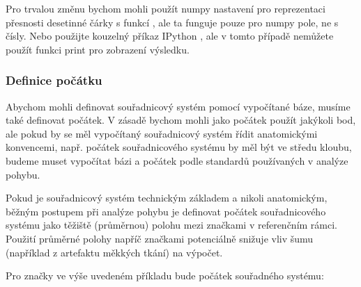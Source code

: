 \documentclass[letterpaper,10pt,english]{jupyterBook}
\begin{document}
\sphinxAtStartPar
Pro trvalou změnu bychom mohli použít numpy nastavení pro reprezentaci přesnosti desetinné čárky s funkcí , ale ta funguje pouze pro numpy pole, ne s čísly. Nebo použijte kouzelný příkaz IPython , ale v tomto případě nemůžete použít funkci print pro zobrazení výsledku.


\subsubsection{Definice počátku}
\label{\detokenize{Prednasky/0_3_Sou_u0159adnicov_xe9_syst_xe9my:definice-pocatku}}
\sphinxAtStartPar
Abychom mohli definovat souřadnicový systém pomocí vypočítané báze, musíme také definovat počátek. V zásadě bychom mohli jako počátek použít jakýkoli bod, ale pokud by se měl vypočítaný souřadnicový systém řídit anatomickými konvencemi, např. počátek souřadnicového systému by měl být ve středu kloubu, budeme muset vypočítat bázi a počátek podle standardů používaných v analýze pohybu.

\sphinxAtStartPar
Pokud je souřadnicový systém technickým základem a nikoli anatomickým, běžným postupem při analýze pohybu je definovat počátek souřadnicového systému jako těžiště (průměrnou) polohu mezi značkami v referenčním rámci. Použití průměrné polohy napříč značkami potenciálně snižuje vliv šumu (například z artefaktu měkkých tkání) na výpočet.

\sphinxAtStartPar
Pro značky ve výše uvedeném příkladu bude počátek souřadného systému:
\end{document}
